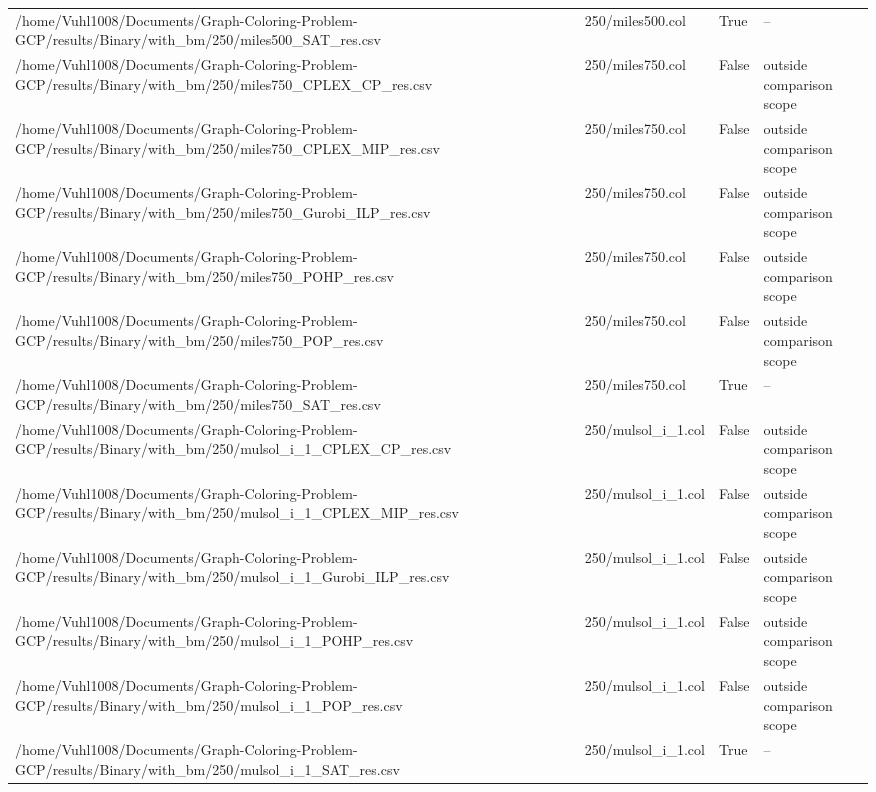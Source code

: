 \begin{table}[htbp]
\begin{tabular}{llll}
/home/Vuhl1008/Documents/Graph-Coloring-Problem-GCP/results/Binary/with\_bm/250/miles500\_SAT\_res.csv & 250/miles500.col & True & -- \\
/home/Vuhl1008/Documents/Graph-Coloring-Problem-GCP/results/Binary/with\_bm/250/miles750\_CPLEX\_CP\_res.csv & 250/miles750.col & False & outside comparison scope \\
/home/Vuhl1008/Documents/Graph-Coloring-Problem-GCP/results/Binary/with\_bm/250/miles750\_CPLEX\_MIP\_res.csv & 250/miles750.col & False & outside comparison scope \\
/home/Vuhl1008/Documents/Graph-Coloring-Problem-GCP/results/Binary/with\_bm/250/miles750\_Gurobi\_ILP\_res.csv & 250/miles750.col & False & outside comparison scope \\
/home/Vuhl1008/Documents/Graph-Coloring-Problem-GCP/results/Binary/with\_bm/250/miles750\_POHP\_res.csv & 250/miles750.col & False & outside comparison scope \\
/home/Vuhl1008/Documents/Graph-Coloring-Problem-GCP/results/Binary/with\_bm/250/miles750\_POP\_res.csv & 250/miles750.col & False & outside comparison scope \\
/home/Vuhl1008/Documents/Graph-Coloring-Problem-GCP/results/Binary/with\_bm/250/miles750\_SAT\_res.csv & 250/miles750.col & True & -- \\
/home/Vuhl1008/Documents/Graph-Coloring-Problem-GCP/results/Binary/with\_bm/250/mulsol\_i\_1\_CPLEX\_CP\_res.csv & 250/mulsol\_i\_1.col & False & outside comparison scope \\
/home/Vuhl1008/Documents/Graph-Coloring-Problem-GCP/results/Binary/with\_bm/250/mulsol\_i\_1\_CPLEX\_MIP\_res.csv & 250/mulsol\_i\_1.col & False & outside comparison scope \\
/home/Vuhl1008/Documents/Graph-Coloring-Problem-GCP/results/Binary/with\_bm/250/mulsol\_i\_1\_Gurobi\_ILP\_res.csv & 250/mulsol\_i\_1.col & False & outside comparison scope \\
/home/Vuhl1008/Documents/Graph-Coloring-Problem-GCP/results/Binary/with\_bm/250/mulsol\_i\_1\_POHP\_res.csv & 250/mulsol\_i\_1.col & False & outside comparison scope \\
/home/Vuhl1008/Documents/Graph-Coloring-Problem-GCP/results/Binary/with\_bm/250/mulsol\_i\_1\_POP\_res.csv & 250/mulsol\_i\_1.col & False & outside comparison scope \\
/home/Vuhl1008/Documents/Graph-Coloring-Problem-GCP/results/Binary/with\_bm/250/mulsol\_i\_1\_SAT\_res.csv & 250/mulsol\_i\_1.col & True & -- \\

\end{tabular}
\end{table}

